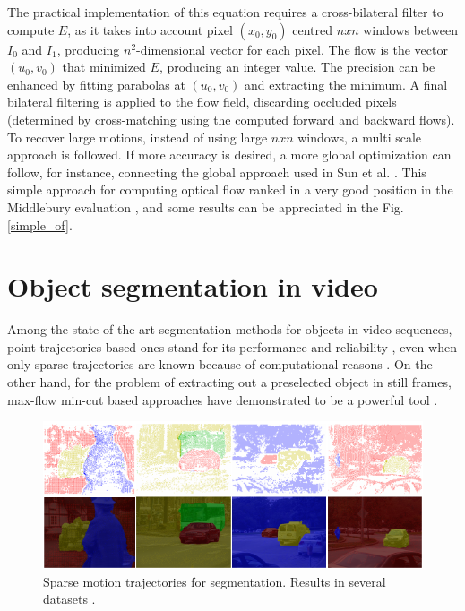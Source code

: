 The practical implementation of this equation requires a cross-bilateral filter to compute $E$, as it takes into account 
pixel $(x_0,y_0)$ centred $nxn$ windows between $I_0$ and $I_1$, producing $n^2$-dimensional vector for each pixel. 
The flow is the vector $(u_0, v_0)$ that minimized $E$, producing an integer value. The precision can be enhanced by fitting 
parabolas at  $(u_0, v_0)$ and extracting the minimum. A final bilateral filtering is applied to the flow field, discarding 
occluded pixels (determined by cross-matching using the computed forward and backward flows). 
To recover large motions, instead of using large $nxn$ windows, a multi scale approach is followed. 
If more accuracy is desired, a more global optimization can follow, for instance, connecting the global approach used in Sun et al. \cite{c40}.
This simple approach for computing optical flow ranked in a very good position in the Middlebury evaluation \cite{c17}, 
and some results can be appreciated in the Fig. \ref{simple_of}.

\section{Object segmentation in video}

Among the state of the art segmentation methods for objects in video
sequences, point trajectories based ones stand for its performance and 
reliability \cite{c33}, even when only sparse trajectories are known because of
computational reasons \cite{c34}. On the other hand, for the problem of extracting out a 
preselected object in still frames, max-flow min-cut based approaches 
have demonstrated to be a powerful tool \cite{c14}\cite{c18}. 

   \begin{figure}[thpb]
      \centering
      \includegraphics[height=0.28\textheight]{../images/point_traj_segm.png}
      \caption{  Sparse motion trajectories for segmentation. Results in several datasets  \cite{c34}. }
      \label{pt_seg}
   \end{figure}


